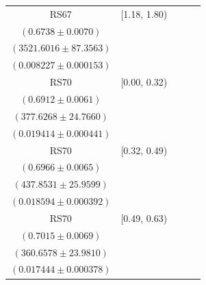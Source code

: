 {\begin{longtable}{|c|c|c|c|c|}
RS67 & [1.18, 1.80) & \begin{tabular}{@{}c@{}}$0.7203 \pm 0.0050$ \\ $(0.6738 \pm 0.0070)$\end{tabular} & \begin{tabular}{@{}c@{}}$3240.1092 \pm 81.0655$ \\ $(3521.6016 \pm 87.3563)$\end{tabular} & \begin{tabular}{@{}c@{}}$0.008912 \pm 0.000159$ \\ $(0.008227 \pm 0.000153)$\end{tabular} \\ \hline
\hline
RS70 & [0.00, 0.32) & \begin{tabular}{@{}c@{}}$0.6946 \pm 0.0092$ \\ $(0.6912 \pm 0.0061)$\end{tabular} & \begin{tabular}{@{}c@{}}$375.7334 \pm 24.6418$ \\ $(377.6268 \pm 24.7660)$\end{tabular} & \begin{tabular}{@{}c@{}}$0.016654 \pm 0.000762$ \\ $(0.019414 \pm 0.000441)$\end{tabular} \\ \hline
RS70 & [0.32, 0.49) & \begin{tabular}{@{}c@{}}$0.7170 \pm 0.0089$ \\ $(0.6966 \pm 0.0065)$\end{tabular} & \begin{tabular}{@{}c@{}}$425.4087 \pm 25.2220$ \\ $(437.8531 \pm 25.9599)$\end{tabular} & \begin{tabular}{@{}c@{}}$0.017369 \pm 0.000710$ \\ $(0.018594 \pm 0.000392)$\end{tabular} \\ \hline
RS70 & [0.49, 0.63) & \begin{tabular}{@{}c@{}}$0.7045 \pm 0.0087$ \\ $(0.7015 \pm 0.0069)$\end{tabular} & \begin{tabular}{@{}c@{}}$359.1260 \pm 23.8792$ \\ $(360.6578 \pm 23.9810)$\end{tabular} & \begin{tabular}{@{}c@{}}$0.016235 \pm 0.000683$ \\ $(0.017444 \pm 0.000378)$\end{tabular} \\ \hline

\end{longtable}}
